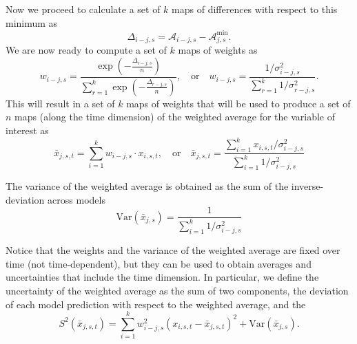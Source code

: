 \documentclass[gmd, manuscript]{copernicus}
\begin{document}
Now we proceed to calculate a set of $k$ maps of differences with respect to this minimum as
\begin{equation}
\Delta_{i-j, s} = \mathcal{A}_{i-j, s} - \mathcal{A}_{j, s}^{\min}.
\end{equation}
We are now ready to compute a set of $k$ maps of weights as
\begin{equation}
w_{i-j, s} = \frac{\exp (- \frac{\Delta_{i-j, s}}{n})}{\sum_{r=1}^k \exp (- \frac{\Delta_{r-j, s}}{n}) },
\quad \mathrm{or} \quad 
w_{i-j, s} = \frac{1/\sigma^2_{i-j,s}}{\sum^k_{r=1} 1/\sigma^2_{r-j, s}}.
\end{equation}
This will result in a set of $k$ maps of weights that will be used to produce a set of $n$ maps (along the time dimension) of the weighted average for the variable of interest as
\begin{equation}
\bar{x}_{j, s, t} = \sum_{i=1}^{k} w_{i-j, s} \cdot x_{i, s, t},
\quad \mathrm{or} \quad
\bar{x}_{j, s, t} = \frac{\sum_{i=1}^k  x_{i, s, t} /{\sigma^2_{i-j, s}}}{\sum_{i=1}^k 1/\sigma^2_{i-j, s}}
\end{equation}

The variance of the weighted average is obtained as the sum of the inverse-deviation across models
\begin{equation}
\mathrm{Var}(\bar{x}_{j,s}) = \frac{1}{\sum_{i=1}^k 1/\sigma^2_{i-j, s}}
\end{equation}



Notice that the weights and the variance of the weighted average are fixed over time (not time-dependent), but they can be used to obtain averages and uncertainties that include the time dimension. In particular, we define the uncertainty of the weighted average as the sum of two components, the deviation of each model prediction with respect to the weighted average, and the 
\begin{equation}
S^2(\bar{x}_{j,s,t}) = \sum_{i=1}^k w^2_{i-j, s}  (x_{i, s, t} - \bar{x}_{j, s, t})^2 + \mathrm{Var}(\bar{x}_{j,s}) .
\end{equation}
\end{document}
